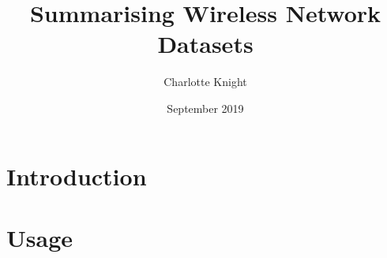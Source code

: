 \documentclass{article}
\title{Summarising Wireless Network Datasets}
\author{Charlotte Knight}
\date{September 2019}
\begin{document}
\maketitle

\newpage
\tableofcontents
\newpage

\section{Introduction}


\section{Usage}




\newpage


\end{document}
